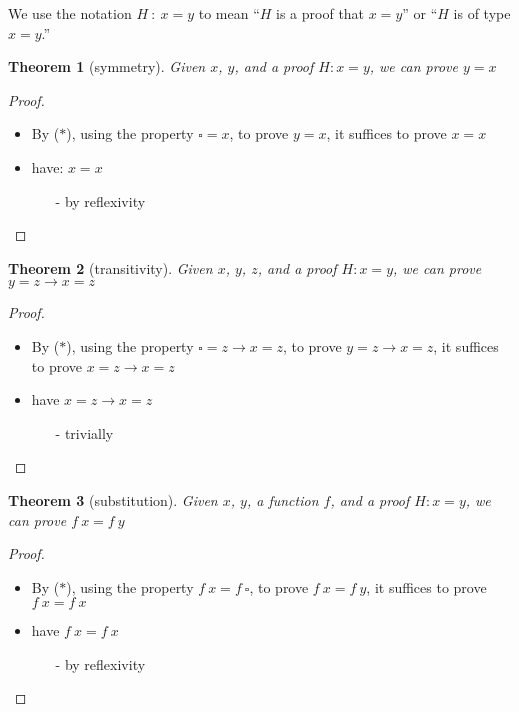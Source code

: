 \documentclass{article}
\newtheorem*{thm*}{Theorem}
\theoremstyle{definition}
\begin{document}
We use the notation $H~:~x = y$ to mean ``$H$ is a proof that $x = y$'' or ``$H$ is of type $x = y$.''

{\setlength{\parskip}{0pt}%
\begin{thm*}[symmetry]
Given $x$, $y$, and a proof $H : x = y$, we can prove $y = x$
\end{thm*}
\begin{proof}
$\left.\right.$\\
\begin{itemize}
  \item By ($\ast$), using the property $\square = x$, to prove $y = x$, it suffices to prove $x = x$
  \item have: $x = x$
  \begin{itemize}
    \item[-] by reflexivity
  \end{itemize}
\end{itemize}
\end{proof}
\begin{thm*}[transitivity]
Given $x$, $y$, $z$, and a proof $H : x = y$, we can prove $y = z \to x = z$
\end{thm*}
\begin{proof}
$\left.\right.$\\
\begin{itemize}
  \item By ($\ast$), using the property $\square = z \to x = z$, to prove $y = z \to x = z$, it suffices to prove $x = z \to x = z$
  \item have $x = z \to x = z$
  \begin{itemize}
    \item[-] trivially
  \end{itemize}
\end{itemize}
\end{proof}
\begin{thm*}[substitution]
Given $x$, $y$, a function $f$, and a proof $H : x = y$, we can prove $f~x = f~y$
\end{thm*}
\begin{proof}
$\left.\right.$\\
\begin{itemize}
  \item By ($\ast$), using the property $f~x = f~\square$, to prove $f~x = f~y$, it suffices to prove $f~x = f~x$
  \item have $f~x = f~x$
  \begin{itemize}
    \item[-] by reflexivity
  \end{itemize}
\end{itemize}
\end{proof}
}
\end{document}
